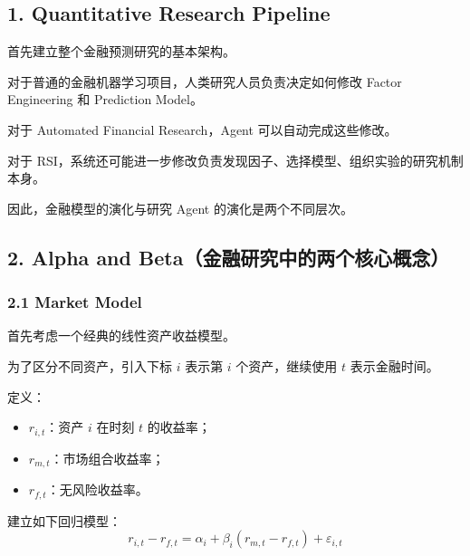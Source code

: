 \hypertarget{part-4-63-0001-quantitative-research-pipeline}{%
\subsection{1. Quantitative Research Pipeline}\label{part-4-63-0001-quantitative-research-pipeline}}

首先建立整个金融预测研究的基本架构。


对于普通的金融机器学习项目，人类研究人员负责决定如何修改 Factor Engineering 和 Prediction Model。

对于 Automated Financial Research，Agent 可以自动完成这些修改。

对于 RSI，系统还可能进一步修改负责发现因子、选择模型、组织实验的研究机制本身。

因此，金融模型的演化与研究 Agent 的演化是两个不同层次。

\hypertarget{part-4-63-0001-alpha-and-betaux91d1ux878dux7814ux7a76ux4e2dux7684ux4e24ux4e2aux6838ux5fc3ux6982ux5ff5}{%
\subsection{2. Alpha and Beta（金融研究中的两个核心概念）}\label{part-4-63-0001-alpha-and-betaux91d1ux878dux7814ux7a76ux4e2dux7684ux4e24ux4e2aux6838ux5fc3ux6982ux5ff5}}

\hypertarget{part-4-63-0001-market-model}{%
\subsubsection{2.1 Market Model}\label{part-4-63-0001-market-model}}

首先考虑一个经典的线性资产收益模型。

为了区分不同资产，引入下标 \(i\) 表示第 \(i\) 个资产，继续使用 \(t\) 表示金融时间。

定义：

\begin{itemize}
\tightlist
\item
  \(r_{i,t}\)：资产 \(i\) 在时刻 \(t\) 的收益率；
\item
  \(r_{m,t}\)：市场组合收益率；
\item
  \(r_{f,t}\)：无风险收益率。
\end{itemize}

建立如下回归模型：
\[\boxed{
r_{i,t}-r_{f,t}
=
\alpha_i+\beta_i(r_{m,t}-r_{f,t})
+\varepsilon_{i,t}
}\]

